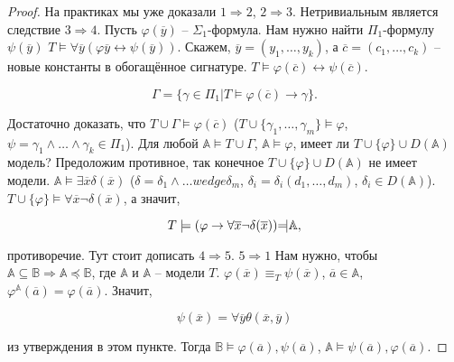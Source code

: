 \begin{proof}
    На практиках мы уже доказали $1 \Rightarrow 2$, $2 \Rightarrow 3$. Нетривиальным является следствие $3 \Rightarrow 4$. Пусть $\varphi(\overline{y})$ -- $\Sigma_1$-формула. Нам нужно найти $\Pi_1$-формулу $\psi(\overline{y})$ $T \models \forall \overline{y} (\varphi{\overline{y}} \leftrightarrow \psi(\overline{y}))$. Скажем, $\overline{y} = (y_1, \ldots, y_k)$, а $\overline{c} = (c_1, \ldots, c_k)$ -- новые константы в обогащённое сигнатуре. $T \models \varphi(\overline{c}) \leftrightarrow \psi(\overline{c})$. 

    \[ 
        \Gamma = \{\gamma \in \Pi_1 \vert T \models \varphi(\overline{c}) \rightarrow \gamma\}.
    \]

    Достаточно доказать, что $T \cup \Gamma \models \varphi(\overline{c})$ ($T \cup \{\gamma_1, \ldots, \gamma_m\} \models \varphi$, $\psi = \gamma_1 \wedge \ldots \wedge \gamma_k \in \Pi_1$). Для любой $\mathbb{A} \models T \cup \Gamma$, $\mathbb{A} \models \varphi$, имеет ли $T \cup \{\varphi\} \cup D(\mathbb{A})$ модель? Предоложим противное, так конечное $T \cup \{\varphi\} \cup D(\mathbb{A})$ не имеет модели. $\mathbb{A} \models \exists \overline{x} \delta(\overline{x})$ ($\delta = \delta_1 \wedge \ldots wedge \delta_m$, $\delta_i = \delta_i(d_1, \ldots, d_m)$, $\delta_i \in D(\mathbb{A})$). $T \cup \{\varphi\} \models \forall \overline{x} \neg \delta(\overline{x})$, а значит, 

    \[ 
        T \models (\varphi \rightarrow \forall \overline{x} \neg \delta(\overline{x})) \text{\rotatebox[origin=c]{180}{$\models$}} \mathbb{A},
    \]

    противоречие. Тут стоит дописать $4 \Rightarrow 5$. $5 \Rightarrow 1$ Нам нужно, чтобы $\mathbb{A} \subseteq \mathbb{B} \Rightarrow \mathbb{A} \preceq \mathbb{B}$, где $\mathbb{A}$ и $\mathbb{A}$ -- модели $T$. $\varphi(\overline{x}) \equiv_T \psi(\overline{x})$, $\overline{a} \in \mathbb{A}$, $\varphi^{\mathbb{A}}(\overline{a}) = \varphi(\overline{a})$. Значит, 

    \[ 
        \psi(\overline{x}) = \forall \overline{y} \theta(\overline{x}, \overline{y})
    \]

    из утверждения в этом пункте. Тогда $\mathbb{B} \models \varphi(\overline{a}), \psi(\overline{a})$, $\mathbb{A} \models \psi(\overline{a}), \varphi(\overline{a})$. 
\end{proof} 

